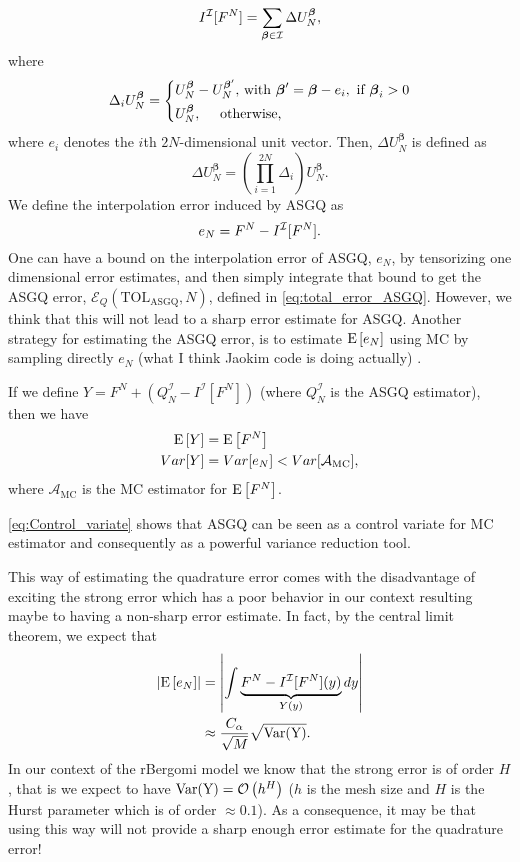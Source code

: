 \begin{equation}
I^{\mathcal{I}}[F^N]= \sum_{\boldsymbol{\beta} \in \mathcal{I}} \Delta U_N^{\boldsymbol{\beta}} ,
\end{equation}
where 
\begin{equation*}
\Delta_i U_N^{\boldsymbol{\beta}} = \left\{ 
\aligned 
 U_N^{\boldsymbol{\beta}} &- U_N^{\boldsymbol{\beta}'}  \text{, with } \boldsymbol{\beta}' =\boldsymbol{\beta} - e_i, \text{ if } \boldsymbol{\beta}_i>0 \\
 U_N^{\boldsymbol{\beta}} &, \quad  \text{ otherwise,}
\endaligned
\right.
\end{equation*}
where $e_i$ denotes the $i$th $2N$-dimensional unit vector. Then, $\Delta
U_N^{\boldsymbol{\beta}}$ is defined as
\begin{equation*}
\Delta U_N^{\boldsymbol{\beta}} = \left( \prod_{i=1}^{2N} \Delta_i \right) U_N^{\boldsymbol{\beta}}.
\end{equation*}
We define the interpolation error induced by ASGQ as
\begin{equation}
e_{N}= F^N-I^{\mathcal{I}}[F^N] .
\end{equation}
One can have a bound on the interpolation error of ASGQ, $e_{N}$, by tensorizing one dimensional error estimates, and  then simply integrate that bound to get the ASGQ  error, $\mathcal{E}_Q(\text{TOL}_{\text{ASGQ}},N)$, defined in \eqref{eq:total_error_ASGQ}. However, we think that this will  not lead to a sharp error estimate for ASGQ. Another strategy for estimating the ASGQ  error, is to estimate $\mathrm{E}\left[e_N\right]$ using MC by sampling directly $e_N$ (what I think Jaokim code is doing actually) .

If we define $Y=F^N+(Q_N^{\mathcal{I}}-I^{\mathcal{I}}[F^N])$ (where $Q_N^{\mathcal{I}}$ is the ASGQ  estimator), then we have
\begin{align}\label{eq:Control_variate}
\mathrm{E}\left[Y\right]&=\mathrm{E}\left[F^N\right]\nonumber\\
Var[Y]&=Var[e_N]< Var[\mathcal{A}_{\text{MC}}],
\end{align}
where $\mathcal{A}_{\text{MC}}$ is the MC estimator for $\mathrm{E}\left[F^N\right]$.

\eqref{eq:Control_variate} shows that ASGQ can be seen as a control variate for MC estimator and consequently as a powerful variance reduction tool.

This way of estimating the quadrature error comes with the disadvantage of exciting the strong error which has a poor behavior in our context resulting maybe to having a non-sharp error estimate. In fact, by the central limit theorem, we expect that
\begin{align}\label{eq:CLT_interpol_errror}
\left\lvert\mathrm{E}\left[e_N\right]\right\rvert&=\left\lvert\int \underbrace{F^N-I^{\mathcal{I}}[F^N](y)}_{Y(y)} dy\right\rvert\nonumber\\
&\approx \frac{C_\alpha}{\sqrt{M}} \sqrt{\text{Var(Y)}}.
\end{align}
In our context of the rBergomi model we know that the strong error is of order $H$, that is we expect to have $\text{Var(Y)}={\mathcal{O}}\left(h^H\right)$ ($h$ is the mesh size and $H$ is the Hurst parameter which is of order $\approx 0.1$). As a consequence, it may be that using this way will not provide a sharp enough error estimate for the quadrature error!

